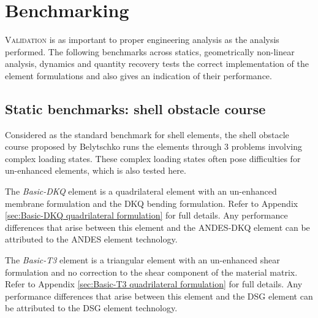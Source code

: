 


\chapter{Benchmarking}

\renewcommand{\Thema}{Benchmarking}

\lettrine[lines=2]{V}{alidation} is as important to proper engineering analysis as the analysis performed. The following benchmarks across statics, geometrically non-linear analysis, dynamics and quantity recovery tests the correct implementation of the element formulations and also gives an indication of their performance. 

\section{Static benchmarks: shell obstacle course}
\label{section:shell obstacle course}

Considered as the standard benchmark for shell elements, the shell obstacle course proposed by Belytschko \cite{Bel85} runs the elements through 3 problems involving complex loading states. These complex loading states often pose difficulties for un-enhanced elements, which is also tested here.

The \textit{Basic-DKQ} element is a quadrilateral element with an un-enhanced membrane formulation and the DKQ bending formulation. Refer to Appendix \ref{sec:Basic-DKQ quadrilateral formulation} for full details. Any performance differences that arise between this element and the ANDES-DKQ element can be attributed to the ANDES element technology.

The \textit{Basic-T3} element is a triangular element with an un-enhanced shear formulation and no correction to the shear component of the material matrix. Refer to Appendix \ref{sec:Basic-T3 quadrilateral formulation} for full details. Any performance differences that arise between this element and the DSG element can be attributed to the DSG element technology.

